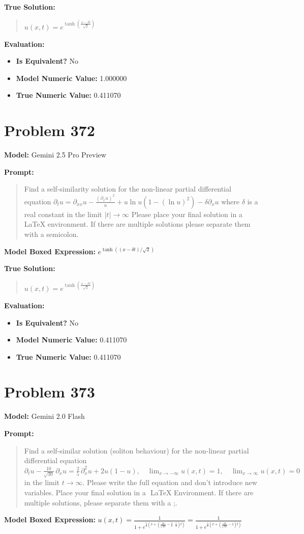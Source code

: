 \documentclass{article}
\begin{document}
{\textbf{True Solution:}
\begin{quote}
$u(x,t) = e^{\tanh\left(\frac{x-\delta t}{\sqrt{2}}\right)}$
\end{quote}

\textbf{Evaluation:}
\begin{itemize}
\item \textbf{Is Equivalent?} No
\item \textbf{Model Numeric Value:} 1.000000
\item \textbf{True Numeric Value:} 0.411070
\end{itemize}
\vspace{1cm}
\section*{Problem 372}
\textbf{Model:} Gemini 2.5 Pro Preview

\textbf{Prompt:}
\begin{quote}
Find a self-similarity solution for the non-linear partial differential equation $ \partial_t u = \partial_{xx} u - \frac{(\partial_x u)^2}{u} + u \ln u \left(1 - (\ln u)^2\right) - \delta \partial_x u $ where $\delta$ is a real constant in the limit $|t| \rightarrow \infty$ Please place your final solution in a $\boxed{}$ LaTeX environment. If there are multiple solutions please separate them with a semicolon.
\end{quote}
\textbf{Model Boxed Expression:} $e^{\tanh((x-\delta t)/\sqrt{2})}$

\textbf{True Solution:}
\begin{quote}
$u(x,t) = e^{\tanh\left(\frac{x-\delta t}{\sqrt{2}}\right)}$
\end{quote}

\textbf{Evaluation:}
\begin{itemize}
\item \textbf{Is Equivalent?} No
\item \textbf{Model Numeric Value:} 0.411070
\item \textbf{True Numeric Value:} 0.411070
\end{itemize}
\vspace{1cm}
\section*{Problem 373}
\textbf{Model:} Gemini 2.0 Flash

\textbf{Prompt:}
\begin{quote}
Find a self-similar solution (soliton behaviour) for the non-linear partial differential equation $\partial_t u - \frac{10}{\sqrt{30}} \, \partial_x u = \frac{2}{5} \, \partial_x^2 u + 2 u (1 - u), \quad \lim_{x \to -\infty} u(x,t) = 1, \quad \lim_{x \to \infty} u(x,t) = 0$ in the limit $t \rightarrow \infty$. Please write the full equation and don't introduce new variables. Place your final solution in a $\boxed{}$ LaTeX Environment. If there are multiple solutions, please separate them with a ;.
\end{quote}
\textbf{Model Boxed Expression:} $u(x,t) = \frac{1}{1 + e^{\frac{5}{2} (x + (\frac{10}{\sqrt{30}} - \frac{2}{5} \cdot \frac{5}{2}) t)}} = \frac{1}{1 + e^{\frac{5}{2} (x + (\frac{10}{\sqrt{30}} - 1) t)}}$

}
\end{document}
